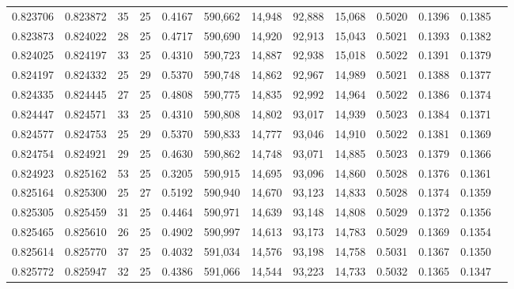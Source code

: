 \begin{tabular}{rrrrrrrrrrrrr}
0.823706 & 0.823872 &    35 &  25 &                                     0.4167 & 590,662 &  14,948 &  92,888 &  15,068 & 0.5020 & 0.1396 & 0.1385 \\
0.823873 & 0.824022 &    28 &  25 &                                     0.4717 & 590,690 &  14,920 &  92,913 &  15,043 & 0.5021 & 0.1393 & 0.1382 \\
0.824025 & 0.824197 &    33 &  25 &                                     0.4310 & 590,723 &  14,887 &  92,938 &  15,018 & 0.5022 & 0.1391 & 0.1379 \\
0.824197 & 0.824332 &    25 &  29 &                                     0.5370 & 590,748 &  14,862 &  92,967 &  14,989 & 0.5021 & 0.1388 & 0.1377 \\
0.824335 & 0.824445 &    27 &  25 &                                     0.4808 & 590,775 &  14,835 &  92,992 &  14,964 & 0.5022 & 0.1386 & 0.1374 \\
0.824447 & 0.824571 &    33 &  25 &                                     0.4310 & 590,808 &  14,802 &  93,017 &  14,939 & 0.5023 & 0.1384 & 0.1371 \\
0.824577 & 0.824753 &    25 &  29 &                                     0.5370 & 590,833 &  14,777 &  93,046 &  14,910 & 0.5022 & 0.1381 & 0.1369 \\
0.824754 & 0.824921 &    29 &  25 &                                     0.4630 & 590,862 &  14,748 &  93,071 &  14,885 & 0.5023 & 0.1379 & 0.1366 \\
0.824923 & 0.825162 &    53 &  25 &                                     0.3205 & 590,915 &  14,695 &  93,096 &  14,860 & 0.5028 & 0.1376 & 0.1361 \\
0.825164 & 0.825300 &    25 &  27 &                                     0.5192 & 590,940 &  14,670 &  93,123 &  14,833 & 0.5028 & 0.1374 & 0.1359 \\
0.825305 & 0.825459 &    31 &  25 &                                     0.4464 & 590,971 &  14,639 &  93,148 &  14,808 & 0.5029 & 0.1372 & 0.1356 \\
0.825465 & 0.825610 &    26 &  25 &                                     0.4902 & 590,997 &  14,613 &  93,173 &  14,783 & 0.5029 & 0.1369 & 0.1354 \\
0.825614 & 0.825770 &    37 &  25 &                                     0.4032 & 591,034 &  14,576 &  93,198 &  14,758 & 0.5031 & 0.1367 & 0.1350 \\
0.825772 & 0.825947 &    32 &  25 &                                     0.4386 & 591,066 &  14,544 &  93,223 &  14,733 & 0.5032 & 0.1365 & 0.1347 \\

\end{tabular}
